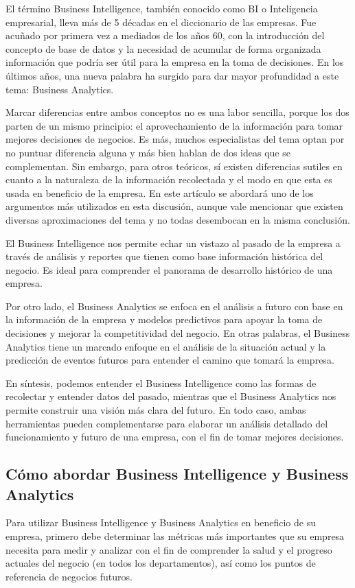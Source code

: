 \documentclass[12pt,a4paper]{report}
\begin{document}
El término Business Intelligence, también conocido como BI o Inteligencia empresarial, lleva más de 5 décadas en el diccionario de las empresas. Fue acuñado por primera vez a mediados de los años 60, con la introducción del concepto de base de datos y la necesidad de acumular de forma organizada información que podría ser útil para la empresa en la toma de decisiones.  En los últimos años, una nueva palabra ha surgido para dar mayor profundidad a este tema: Business Analytics. 

Marcar diferencias entre ambos conceptos no es una labor sencilla, porque los dos parten de un mismo principio: el aprovechamiento de la información para tomar mejores decisiones de negocios. Es más, muchos especialistas del tema optan por no puntuar diferencia alguna y más bien hablan de dos ideas que se complementan. Sin embargo, para otros teóricos, sí existen diferencias sutiles en cuanto a la naturaleza de la información recolectada y el modo en que esta es usada en beneficio de la empresa. En este artículo se abordará uno de los argumentos más utilizados en esta discusión, aunque vale mencionar que existen diversas aproximaciones del tema y no todas desembocan en la misma conclusión. 

El Business Intelligence nos permite echar un vistazo al pasado de la empresa a través de análisis y reportes que tienen como base información histórica del negocio. Es ideal para comprender el panorama de desarrollo histórico de una empresa. 

Por otro lado, el Business Analytics se enfoca en el análisis a futuro con base en la información de la empresa y modelos predictivos para apoyar la toma de decisiones y mejorar la competitividad del negocio. En otras palabras, el Business Analytics tiene un marcado enfoque en el análisis de la situación actual y la predicción de eventos futuros para entender el camino que tomará la empresa.

En síntesis, podemos entender el Business Intelligence como las formas de recolectar y entender datos del pasado, mientras que el Business Analytics nos permite construir una visión más clara del futuro. En todo caso, ambas herramientas pueden complementarse para elaborar un análisis detallado del funcionamiento y futuro de una empresa, con el fin de tomar mejores decisiones.

\subsection{Cómo abordar Business Intelligence y Business Analytics}
Para utilizar Business Intelligence y Business Analytics en beneficio de su empresa, primero debe determinar las métricas más importantes que su empresa necesita para medir y analizar con el fin de comprender la salud y el progreso actuales del negocio (en todos los departamentos), así como los puntos de referencia de negocios futuros.
\end{document}

